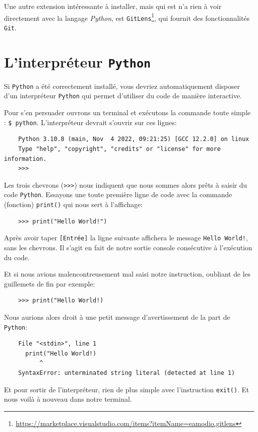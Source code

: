 Une autre extension intéressante à installer, mais qui est n'a rien à voir directement avec la langage \textit{Python}, est \texttt{GitLens}\footnote{\url{https://marketplace.visualstudio.com/items?itemName=eamodio.gitlens}}, qui fournit des fonctionnalités \texttt{Git}.
\medskip

\section{L'interpréteur \texttt{Python}}
Si \texttt{Python} a été correctement installé, vous devriez automatiquement disposer d'un interpréteur \texttt{Python} qui permet d'utiliser du code de manière interactive.
\medskip

Pour s'en persuader ouvrons un terminal et exécutons la commande toute simple : \verb|$ python|. L'interpréteur devrait s'ouvrir sur ces lignes:
\begin{verbatim}
    Python 3.10.8 (main, Nov  4 2022, 09:21:25) [GCC 12.2.0] on linux
    Type "help", "copyright", "credits" or "license" for more information.
    >>> 
\end{verbatim}
\medskip

Les trois chevrons (\verb|>>>|) nous indiquent que nous sommes alors prêts à saisir du code \texttt{Python}. Essayons une toute première ligne de code avec la commande (fonction) \texttt{print()} qui nous sert à l'affichage:
\begin{verbatim}
    >>> print("Hello World!")
\end{verbatim}
\medskip

Après avoir taper \texttt{[Entrée]} la ligne suivante affichera le message \texttt{Hello World!}, sans les chevrons. Il s'agit en fait de notre sortie console consécutive à l'exécution du code.
\medskip

Et si nous avions malencontreusement mal saisi notre instruction, oubliant de les guillemets de fin par exemple:
\begin{verbatim}
    >>> print("Hello World!)
\end{verbatim}
\medskip

Nous aurions alors droit à une petit message d'avertissement de la part de \texttt{Python}:
\begin{verbatim}
    File "<stdin>", line 1
      print("Hello World!)
          ^
    SyntaxError: unterminated string literal (detected at line 1)
\end{verbatim}

Et pour sortir de l'interpréteur, rien de plus simple avec l'instruction \texttt{exit()}. Et nous voilà à nouveau dans notre terminal.
\medskip

